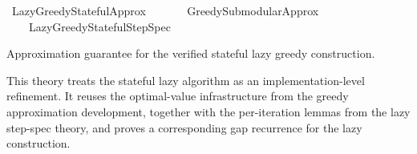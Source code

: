 %
\begin{isabellebody}%
%
%
\isadelimtheory
%
\endisadelimtheory
%
\isatagtheory
{}\isamarkupfalse%
\ Lazy{\isacharunderscore}{\kern0pt}Greedy{\isacharunderscore}{\kern0pt}Stateful{\isacharunderscore}{\kern0pt}Approx\isanewline
\ \ \isanewline
\ \ \ \ Greedy{\isacharunderscore}{\kern0pt}Submodular{\isacharunderscore}{\kern0pt}Approx\isanewline
\ \ \ \ Lazy{\isacharunderscore}{\kern0pt}Greedy{\isacharunderscore}{\kern0pt}Stateful{\isacharunderscore}{\kern0pt}StepSpec\isanewline
{}%
\endisatagtheory
{\isafoldtheory}%
%
\isadelimtheory
%
\endisadelimtheory
%
\begin{isamarkuptext}%
Approximation guarantee for the verified stateful lazy greedy construction.

  This theory treats the stateful lazy algorithm as an implementation-level
  refinement. It reuses the optimal-value infrastructure from the greedy
  approximation development, together with the per-iteration lemmas from the
  lazy step-spec theory, and proves a corresponding gap recurrence for the
  lazy construction.


\end{isamarkuptext}
\end{isabellebody}
